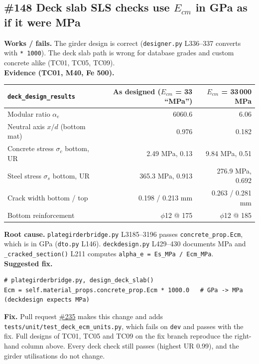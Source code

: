 \documentclass[11pt,a4paper]{article}
\newcommand{\issue}[1]{\href{https://github.com/Nidhikhare12/OsdagBridge/issues/#1}{\##1}}
\newcommand{\src}[1]{\texttt{#1}}
\begin{document}
\subsection{\#148 Deck slab SLS checks use $E_{cm}$ in GPa as if it were MPa}
\textbf{Works / fails.} The girder design is correct (\src{designer.py} L336--337 converts with \texttt{* 1000}). The deck slab
path is wrong for database grades and custom concrete alike (TC01, TC05, TC09).\\
\textbf{Evidence (TC01, M40, Fe 500).}
\begin{center}\small
\begin{tabular}{@{}lrr@{}}
\toprule
\texttt{deck\_design\_results} & \textbf{As designed ($E_{cm}$ = 33 ``MPa'')} & \textbf{$E_{cm}$ = 33\,000 MPa} \\
\midrule
Modular ratio $\alpha_e$ & 6060.6 & 6.06 \\
Neutral axis $x/d$ (bottom mat) & 0.976 & 0.182 \\
Concrete stress $\sigma_c$ bottom, UR & 2.49 MPa, 0.13 & 9.84 MPa, 0.51 \\
Steel stress $\sigma_s$ bottom, UR & 365.3 MPa, 0.913 & 276.9 MPa, 0.692 \\
Crack width bottom / top & 0.198 / 0.213 mm & 0.263 / 0.281 mm \\
Bottom reinforcement & $\phi$12 @ 175 & $\phi$12 @ 185 \\
\bottomrule
\end{tabular}
\end{center}
\textbf{Root cause.} \src{plategirderbridge.py} L3185--3196 passes \texttt{concrete\_prop.Ecm}, which is in GPa (\src{dto.py}
L146). \src{deckdesign.py} L429--430 documents MPa and \texttt{\_cracked\_section()} L211 computes
\texttt{alpha\_e = Es\_MPa / Ecm\_MPa}.\\
\textbf{Suggested fix.}
\begin{Verbatim}[frame=single,framesep=5pt,fontsize=\footnotesize,samepage=true]
# plategirderbridge.py, design_deck_slab()
Ecm = self.material_props.concrete_prop.Ecm * 1000.0   # GPa -> MPa (deckdesign expects MPa)
\end{Verbatim}
\textbf{Fix.} Pull request \issue{235} makes this change and adds \texttt{tests/unit/test\_deck\_ecm\_units.py}, which fails on
\texttt{dev} and passes with the fix. Full designs of TC01, TC05 and TC09 on the fix branch reproduce the right-hand column
above. Every deck check still passes (highest UR 0.99), and the girder utilisations do not change.
\end{document}
